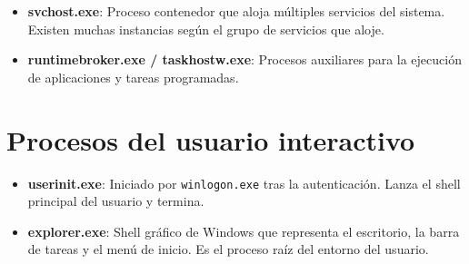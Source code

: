 \begin{itemize}
    \item \textbf{svchost.exe}: Proceso contenedor que aloja múltiples servicios
    del sistema. Existen muchas instancias según el grupo de servicios que
    aloje.
    \item \textbf{runtimebroker.exe / taskhostw.exe}: Procesos auxiliares para
    la ejecución de aplicaciones y tareas programadas.
\end{itemize}

\section*{Procesos del usuario interactivo}

\begin{itemize}
    \item \textbf{userinit.exe}: Iniciado por \texttt{winlogon.exe} tras la
    autenticación. Lanza el shell principal del usuario y termina.
    \item \textbf{explorer.exe}: Shell gráfico de Windows que representa el
    escritorio, la barra de tareas y el menú de inicio. Es el proceso raíz del
    entorno del usuario.
\end{itemize}